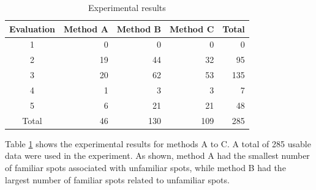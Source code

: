 \documentclass[journal]{IAENGtran}
\begin{document}
\begin{table}[t]
  \caption{Experimental results}
  \label{table:Experimental results}
  \centering
  \begin{tabular}{c|r|r|r|r}
  \hline
  Evaluation & \multicolumn{1}{c|}{Method A} & \multicolumn{1}{c|}{Method B} & \multicolumn{1}{c|}{Method C} &  \multicolumn{1}{c}{Total} \\ \hline
  1  & 0                      & 0                      & 0                      & 0                      \\
  2  & 19                     & 44                     & 32                     & 95                    \\
  3  & 20                     & 62                     & 53                     & 135                    \\
  4  & 1                      & 3                      & 3                      & 7                     \\
  5  & 6                      & 21                     & 21                     & 48                     \\ \hline
  Total & 46                     & 130                    & 109                    & 285                    \\ \hline
  \end{tabular}
\end{table}

Table \ref{table:Experimental results} shows the experimental results for methods A to C.
A total of 285 usable data were used in the experiment.
As shown, method A had the smallest number of familiar spots associated with unfamiliar spots, while method B had the largest number of familiar spots related to unfamiliar spots.
\end{document}
